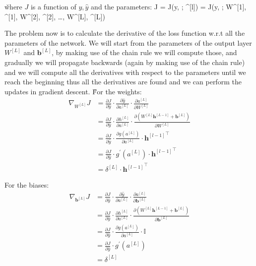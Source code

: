 \v

where $J$ is a function of $y, \hat{y}$ and the parameters:
\bse
J = J(y,  ; \theta^{[l]}) = J(y,  ; W^{[1]}, ^{[1]}, W^{[2]}, ^{[2]},
\ldots, W^{[L]}, ^{[L]})
\ese

The problem now is to calculate the derivative of the loss function w.r.t all the parameters of the network. We will
start from the parameters of the output layer $W^{[L]}$ and $\boldsymbol{b}^{[L]}$, by making use of the chain rule
we will compute those, and gradually we will propagate backwards (again by making use of the chain rule) and we will
compute all the derivatives with respect to the parameters until we reach the beginning thus all the derivatives are
found and we can perform the updates in gradient descent. \v

For the weights:
{\setlength{\jot}{5pt}
\begin{align*}
\nabla_{W^{[L]}} J & = \frac{\partial J}{\partial \hat{y}} \cdot \frac{\partial \hat{y}}{\partial a^{[L]}} \cdot
\frac{\partial a^{[L]}}{\partial W^{[L]}} \\
& = \frac{\partial J}{\partial \hat{y}} \cdot \frac{\partial h^{[L]}}{\partial a^{[L]}}
\cdot \frac{\partial \left( W^{[L]} \boldsymbol{h}^{[L-1]} + \boldsymbol{b}^{[L]} \right)}{\partial W^{[L]}} \\
& = \frac{\partial J}{\partial \hat{y}} \cdot \frac{\partial g(a^{[L]})}{\partial a^{[L]}}
\cdot {\boldsymbol{h}^{[l-1]}}^{\intercal} \\
& = \frac{\partial J}{\partial \hat{y}} \cdot g^\prime (a^{[L]}) \cdot {\boldsymbol{h}^{[l-1]}}^{\intercal}\\
& = \delta^{[L]} \cdot {\boldsymbol{h}^{[l-1]}}^{\intercal}
\end{align*}}

For the biases:
\begingroup
\allowdisplaybreaks
{\setlength{\jot}{5pt}
\begin{align*}
\nabla_{\boldsymbol{b}^{[L]}} J & = \frac{\partial J}{\partial\hat{y}}
\cdot \frac{\partial \hat{y}}{\partial a^{[L]}} \cdot \frac{\partial a^{[L]}}{\partial \boldsymbol{b}^{[L]}} \\
& = \frac{\partial J}{\partial \hat{y}} \cdot \frac{\partial h^{[L]}}{\partial a^{[L]}}
\cdot \frac{\partial \left( W^{[L]} \boldsymbol{h}^{[L-1]} + \boldsymbol{b}^{[L]} \right)}{\partial \boldsymbol{b}^{[L]}} \\
& = \frac{\partial J}{\partial \hat{y}} \cdot \frac{\partial g(a^{[L]})}{\partial a^{[L]}} \cdot \mathbb{I} \\
& = \frac{\partial J}{\partial \hat{y}} \cdot g^\prime (a^{[L]}) \\
& = \delta^{[L]}
\end{align*}}
\endgroup

